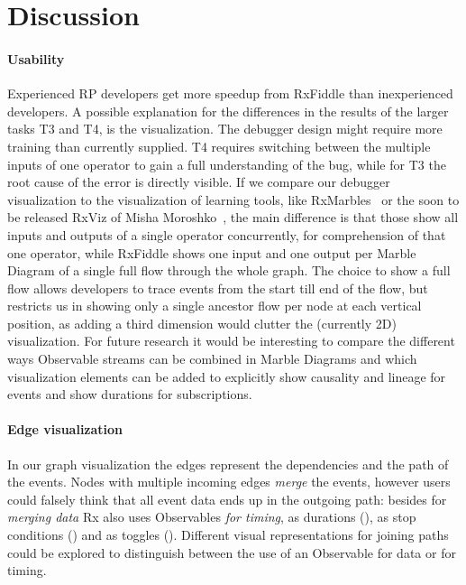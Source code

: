 \section{Discussion}

\paragraph{Usability}
Experienced RP developers get more speedup from RxFiddle than inexperienced developers. A possible explanation for the differences in the results of the larger tasks T3 and T4, is the visualization. The debugger design might require more training than currently supplied. T4 requires switching between the multiple inputs of one operator to gain a full understanding of the bug, while for T3 the root cause of the error is directly visible. If we compare our debugger visualization to the visualization of learning tools, like RxMarbles~\cite{rxmarbles} or the soon to be released RxViz of Misha Moroshko~\cite{rxviz}, the main difference is that those show all inputs and outputs of a single operator concurrently, for comprehension of that one operator, while RxFiddle shows one input and one output per Marble Diagram of a single full flow through the whole graph. The choice to show a full flow allows developers to trace events from the start till end of the flow, but restricts us in showing only a single ancestor flow per node at each vertical position, as adding a third dimension would clutter the (currently 2D) visualization. For future research it would be interesting to compare the different ways Observable streams can be combined in Marble Diagrams and which visualization elements can be added to explicitly show causality and lineage for events and show durations for subscriptions.

\paragraph{Edge visualization}
In our graph visualization the edges represent the dependencies and the path of the events. Nodes with multiple incoming edges \emph{merge} the events, however users could falsely think that all event data ends up in the outgoing path: besides for \textit{merging data} Rx also uses Observables \textit{for timing}, as durations (), as stop conditions () and as toggles (). Different visual representations for joining paths could be explored to distinguish between the use of an Observable for data or for timing.
